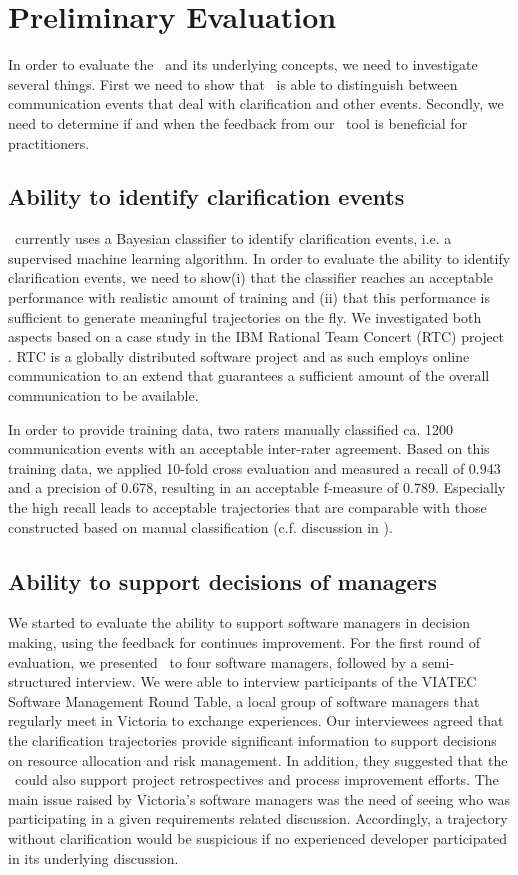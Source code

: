 \section{Preliminary Evaluation}
In order to evaluate the \viss\ and its underlying concepts, we need to investigate several things.
First we need to show that \viss\ is able to distinguish between communication events that deal with clarification and other events. 
Secondly, we need to determine if and when the feedback from our \viss\ tool is beneficial for practitioners. 

\subsection{Ability to identify clarification events}
\viss\ currently uses a Bayesian classifier to identify clarification events, i.e. a supervised machine learning algorithm.
In order to evaluate the ability to identify clarification events, we need to show(i)  that the classifier reaches an acceptable performance with realistic amount of training and (ii) that this performance is sufficient to generate meaningful trajectories on the fly.
We investigated both aspects based on a case study in the IBM Rational Team Concert (RTC) project \cite{Knauss2012f}.
RTC is a globally distributed software project and as such employs online communication to an extend that guarantees a sufficient amount of the overall communication to be available.

In order to provide training data, two raters manually classified ca. 1200 communication events with an acceptable inter-rater agreement.  
Based on this training data, we applied 10-fold cross evaluation and measured a recall of 0.943 and a precision of  0.678, resulting in an acceptable f-measure of 0.789.
Especially the high recall leads to acceptable trajectories that are comparable with those constructed based on manual classification (c.f. discussion in \cite{Knauss2012f}).

\subsection{Ability to support decisions of managers}
We started to evaluate the ability to support software managers in decision making, using the feedback for continues improvement. 
For the first round of evaluation, we presented \viss\ to four software managers, followed by a semi-structured interview.
We were able to interview participants of the VIATEC Software Management Round Table, a local group of software managers that regularly meet in Victoria to exchange experiences.
Our interviewees agreed that the clarification trajectories provide significant information to support decisions on resource allocation and risk management. 
In addition, they suggested that the \viss\ could also support project retrospectives and process improvement efforts. 
The main issue raised by Victoria's software managers was the need of seeing who was participating in a given requirements related discussion. 
Accordingly, a trajectory without clarification would be suspicious if no experienced developer participated in its underlying discussion. 


